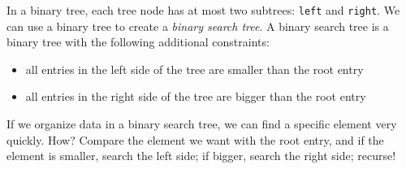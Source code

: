 In a binary tree, each tree node has at most two subtrees: \texttt{left} and 
\texttt{right}. We can use a binary tree to create a 
\textit{binary search tree}. A binary search tree is a binary tree with
the following additional constraints: 
\begin{itemize}
\item all entries in the left side of the tree are smaller than the root entry
\item all entries in the right side of the tree are bigger than the root entry
\end{itemize}
If we organize data in a binary search tree, we can find a specific element very quickly. How? Compare the element we want with the root entry, and if the element is smaller, search the left side; if bigger, search the right side; recurse!
